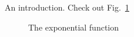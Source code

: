 
An introduction. Check out Fig.~\ref{fig:example}

\begin{figure}
	\centering
	\caption{The exponential function}
	\label{fig:example}
\end{figure}